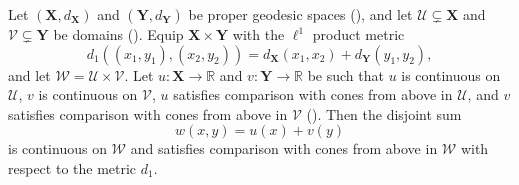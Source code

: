 \begin{theorem}
Let $(\mathbf X,d_{\mathbf X})$ and $(\mathbf Y,d_{\mathbf Y})$ be proper geodesic spaces (), and let $\mathcal U\subsetneq\mathbf X$ and $\mathcal V\subsetneq\mathbf Y$ be domains (). Equip $\mathbf X\times\mathbf Y$ with the $\ell^1$ product metric
\[
d_1((x_1,y_1),(x_2,y_2))=d_{\mathbf X}(x_1,x_2)+d_{\mathbf Y}(y_1,y_2),
\]
and let $\mathcal W=\mathcal U\times\mathcal V$. Let $u:\mathbf X\to\mathbb R$ and $v:\mathbf Y\to\mathbb R$ be such that $u$ is continuous on $\mathcal U$, $v$ is continuous on $\mathcal V$, $u$ satisfies comparison with cones from above in $\mathcal U$, and $v$ satisfies comparison with cones from above in $\mathcal V$ (). Then the disjoint sum
\[
w(x,y)=u(x)+v(y)
\]
is continuous on $\mathcal W$ and satisfies comparison with cones from above in $\mathcal W$ with respect to the metric $d_1$.
\end{theorem}
